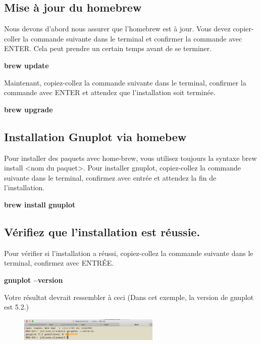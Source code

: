 \documentclass{article}
\begin{document}
\subsection{Mise à jour du homebrew}
Nous devons d'abord nous assurer que l'homebrew est à jour.
Vous devez copier-coller la commande suivante dans le terminal et confirmer la commande avec ENTER. Cela peut prendre un certain temps avant de se terminer.
\begin{tcolorbox}[width=\textwidth,colframe=Bittersweet,colback={black},title={Ceci est le terminal},outer arc=0mm,colupper=white]    
      \large\textbf{brew update}
\end{tcolorbox}
Maintenant, copiez-collez la commande suivante dans le terminal, confirmer la commande avec ENTER et attendez que l'installation soit terminée.
\begin{tcolorbox}[width=\textwidth,colframe=Bittersweet,colback={black},title={Ceci est le terminal},outer arc=0mm,colupper=white]    
      \large\textbf{brew upgrade}
\end{tcolorbox}
\subsection{Installation Gnuplot via homebew}
Pour installer des paquets avec home-brew, vous utilisez toujours la syntaxe brew install <nom du paquet>. Pour installer gnuplot, copiez-collez la commande suivante dans le terminal, confirmez avec entrée et attendez la fin de l'installation.
\begin{tcolorbox}[width=\textwidth,colframe=Bittersweet,colback={black},title={Ceci est le terminal},outer arc=0mm,colupper=white]    
      \large\textbf{brew install gnuplot}
\end{tcolorbox}
\subsection{Vérifiez que l'installation est réussie.}
Pour vérifier si l'installation a réussi, copiez-collez la commande suivante dans le terminal, confirmez avec ENTRÉE.
\begin{tcolorbox}[width=\textwidth,colframe=Bittersweet,colback={black},title={Ceci est le terminal},outer arc=0mm,colupper=white]    
      \large\textbf{gnuplot --version}
\end{tcolorbox}
Votre résultat devrait ressembler à ceci (Dans cet exemple, la version de gnuplot est 5.2.)
\begin{figure}[H]
\center
\includegraphics[width=0.6\textwidth]{Plots/GnuplotCheck.png}
\end{figure}
\end{document}
